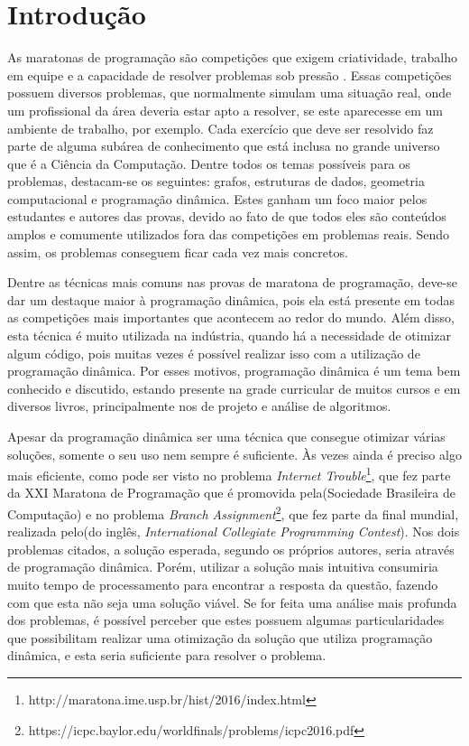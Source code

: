 \chapter{Introdu\c{c}\~ao}
\label{chap:introducao}

As maratonas de programação são competições que exigem criatividade, trabalho em equipe e a capacidade de resolver problemas sob pressão \cite{Piekarski2015}. Essas competições possuem diversos problemas, que normalmente simulam uma situação real, onde um profissional da área deveria estar apto a resolver, se este aparecesse em um ambiente de trabalho, por exemplo. Cada exercício que deve ser resolvido faz parte de alguma subárea de conhecimento que está inclusa no grande universo que é a Ciência da Computação. Dentre todos os temas possíveis para os problemas, destacam-se os seguintes: grafos, estruturas de dados, geometria computacional e programação dinâmica. Estes ganham um foco maior pelos estudantes e autores das provas, devido ao fato de que todos eles são conteúdos amplos e comumente utilizados fora das competições em problemas reais. Sendo assim, os problemas conseguem ficar cada vez mais concretos.

Dentre as técnicas mais comuns nas provas de maratona de programação, deve-se dar um destaque maior à programação dinâmica, pois ela está presente em todas as competições mais importantes que acontecem ao redor do mundo. Além disso, esta técnica é muito utilizada na indústria, quando há a necessidade de otimizar algum código, pois muitas vezes é possível realizar isso com a utilização de programação dinâmica. Por esses motivos, programação dinâmica é um tema bem conhecido e discutido, estando presente na grade curricular de muitos cursos e em diversos livros, principalmente nos de projeto e análise de algoritmos.

Apesar da programação dinâmica ser uma técnica que consegue otimizar várias soluções, somente o seu uso nem sempre é suficiente. Às vezes ainda é preciso algo mais eficiente, como pode ser visto no problema \textit{Internet Trouble}\footnote{http://maratona.ime.usp.br/hist/2016/index.html}, que fez parte da XXI Maratona de Programação que é promovida pela(Sociedade Brasileira de Computação) e no problema \textit{Branch Assignment}\footnote{https://icpc.baylor.edu/worldfinals/problems/icpc2016.pdf}, que fez parte da final mundial, realizada pelo(do inglês, \textit{International Collegiate Programming Contest}). Nos dois problemas citados, a solução esperada, segundo os próprios autores, seria através de programação dinâmica. Porém, utilizar a solução mais intuitiva consumiria muito tempo de processamento para encontrar a resposta da questão, fazendo com que esta não seja uma solução viável. Se for feita uma análise mais profunda dos problemas, é possível perceber que estes possuem algumas particularidades que possibilitam realizar uma otimização da solução que utiliza programação dinâmica, e esta seria suficiente para resolver o problema.

